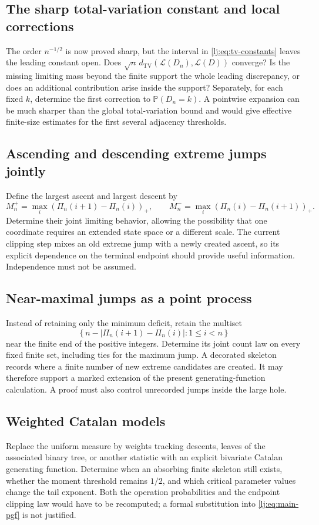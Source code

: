 \documentclass[11pt,a4paper]{article}
\theoremstyle{definition}\newaliascnt{definition}{theorem}
\theoremstyle{remark}\newaliascnt{remark}{theorem}
\newcommand{\ljP}{\mathbb P}
\newcommand{\ljTV}{d_{\mathrm{TV}}}
\newcommand{\ljLaw}{\mathcal L}
\begin{document}
\subsection{The sharp total-variation constant and local corrections}
\label{mj:sec:lj-tv}
The order $n^{-1/2}$ is now proved sharp, but the interval in
\eqref{lj:eq:tv-constants} leaves the leading constant open. Does
$\sqrt n\,\ljTV(\ljLaw(D_n),\ljLaw(D))$ converge? Is the missing limiting
mass beyond the finite support the whole leading discrepancy, or does
an additional contribution arise inside the support?
Separately, for each fixed $k$, determine the first correction to
$\ljP(D_n=k)$. A pointwise expansion can be much sharper than the global
total-variation bound and would give effective finite-size estimates
for the first several adjacency thresholds.

\subsection{Ascending and descending extreme jumps jointly}
\label{mj:sec:lj-ascent}
Define the largest ascent and largest descent by
\[
 M_n^+=\max_i(\Pi_n(i+1)-\Pi_n(i))_+,
 \qquad
 M_n^-=\max_i(\Pi_n(i)-\Pi_n(i+1))_+.
\]
Determine their joint limiting behavior, allowing the possibility that
one coordinate requires an extended state space or a different scale.
The current clipping step mixes an old extreme jump with a newly created
ascent, so its explicit dependence on the terminal endpoint should
provide useful information. Independence must not be assumed.

\subsection{Near-maximal jumps as a point process}
Instead of retaining only the minimum deficit, retain the multiset
\[
 \left\{n-|\Pi_n(i+1)-\Pi_n(i)|:1\le i<n\right\}
\]
near the finite end of the positive integers. Determine its joint count
law on every fixed finite set, including ties for the maximum jump.
A decorated skeleton records where a finite number of new extreme
candidates are created. It may therefore support a marked extension of
the present generating-function calculation. A proof must also control
unrecorded jumps inside the large hole.

\subsection{Weighted Catalan models}
\label{mj:sec:lj-weighted}
Replace the uniform measure by weights tracking descents, leaves of the
associated binary tree, or another statistic with an explicit bivariate
Catalan generating function. Determine when an absorbing finite
skeleton still exists, whether the moment threshold remains $1/2$, and
which critical parameter values change the tail exponent. Both the
operation probabilities and the endpoint clipping law would have to be
recomputed; a formal substitution into \eqref{lj:eq:main-pgf} is not justified.
\end{document}
